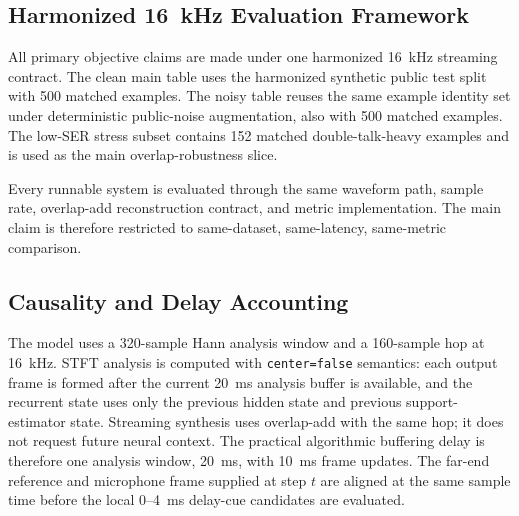\documentclass[journal]{IEEEtran}
\begin{document}
\subsection{Harmonized 16~kHz Evaluation Framework}
All primary objective claims are made under one harmonized 16~kHz streaming contract. The clean main table uses the harmonized synthetic public test split with 500 matched examples. The noisy table reuses the same example identity set under deterministic public-noise augmentation, also with 500 matched examples. The low-SER stress subset contains 152 matched double-talk-heavy examples and is used as the main overlap-robustness slice.

Every runnable system is evaluated through the same waveform path, sample rate, overlap-add reconstruction contract, and metric implementation. The main claim is therefore restricted to same-dataset, same-latency, same-metric comparison.

\subsection{Causality and Delay Accounting}
The model uses a 320-sample Hann analysis window and a 160-sample hop at 16~kHz. STFT analysis is computed with \texttt{center=false} semantics: each output frame is formed after the current 20~ms analysis buffer is available, and the recurrent state uses only the previous hidden state and previous support-estimator state. Streaming synthesis uses overlap-add with the same hop; it does not request future neural context. The practical algorithmic buffering delay is therefore one analysis window, 20~ms, with 10~ms frame updates. The far-end reference and microphone frame supplied at step $t$ are aligned at the same sample time before the local 0--4~ms delay-cue candidates are evaluated.
\end{document}
